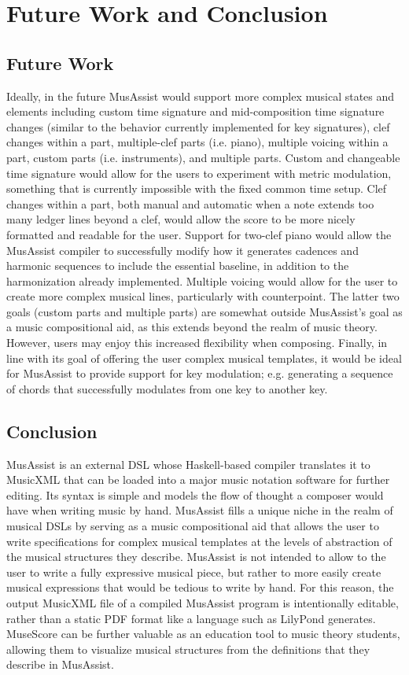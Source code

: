 \documentclass{report}
\begin{document}
\chapter{Future Work and Conclusion}
\section{Future Work}
Ideally, in the future MusAssist would support more complex musical states and elements including custom time signature and mid-composition time signature changes (similar to the behavior currently implemented for key signatures), clef changes within a part, multiple-clef parts (i.e. piano), multiple voicing within a part, custom parts (i.e. instruments), and multiple parts. Custom and changeable time signature would allow for the users to experiment with metric modulation, something that is currently impossible with the fixed common time setup. Clef changes within a part, both manual and automatic when a note extends too many ledger lines beyond a clef, would allow the score to be more nicely formatted and readable for the user. Support for two-clef piano would allow the MusAssist compiler to successfully modify how it generates cadences and harmonic sequences to include the essential baseline, in addition to the harmonization already implemented. Multiple voicing would allow for the user to create more complex musical lines, particularly with counterpoint. The latter two goals (custom parts and multiple parts) are somewhat outside MusAssist's goal as a music compositional aid, as this extends beyond the realm of music theory. However, users may enjoy this increased flexibility when composing. Finally, in line with its goal of offering the user complex musical templates, it would be ideal for MusAssist to provide support for key modulation; e.g. generating a sequence of chords that successfully modulates from one key to another key.
\section{Conclusion}
MusAssist is an external DSL whose Haskell-based compiler translates it to MusicXML that can be loaded into a major music notation software for further editing. Its syntax is simple and models the flow of thought a composer would have when writing music by hand. MusAssist fills a unique niche in the realm of musical DSLs by serving as a music compositional aid that allows the user to write specifications for complex musical templates at the levels of abstraction of the musical structures they describe. MusAssist is not intended to allow to the user to write a fully expressive musical piece, but rather to more easily create musical expressions that would be tedious to write by hand. For this reason, the output MusicXML file of a compiled MusAssist program is intentionally editable, rather than a static PDF format like a language such as LilyPond generates. MuseScore can be further valuable as an education tool to music theory students, allowing them to visualize musical structures from the definitions that they describe in MusAssist.
\end{document}
